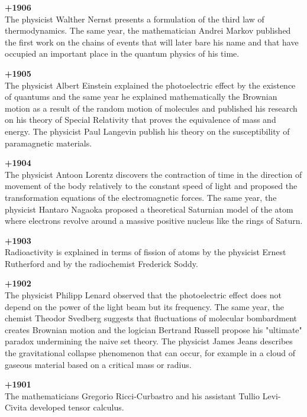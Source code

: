 \textbf{+1906}\\
The physicist Walther Nernst presents a formulation of the third law of thermodynamics. The same year, the mathematician Andrei Markov published the first work on the chains of events that will later bare his name and that have occupied an important place in the quantum physics of his time. 

\textbf{+1905}\\
The physicist Albert Einstein explained the photoelectric effect by the existence of quantums and the same year he explained mathematically the Brownian motion as a result of the random motion of molecules and published his research on his theory of Special Relativity that proves the equivalence of mass and energy. The physicist Paul Langevin publish his theory on the susceptibility of paramagnetic materials.

\textbf{+1904}\\
The physicist Antoon Lorentz discovers the contraction of time in the direction of movement of the body relatively to the constant speed of light and proposed the transformation equations of the electromagnetic forces. The same year, the physicist Hantaro Nagaoka proposed a theoretical Saturnian model of the atom where electrons revolve around a massive positive nucleus like the rings of Saturn.

\textbf{+1903}\\
Radioactivity is explained in terms of fission of atoms by the physicist Ernest Rutherford and by the radiochemist Frederick Soddy.

\pagebreak
\textbf{+1902}\\
The physicist Philipp Lenard observed that the photoelectric effect does not depend on the power of the light beam but its frequency. The same year, the chemist Theodor Svedberg suggests that fluctuations of molecular bombardment creates Brownian motion and the logician Bertrand Russell propose his "ultimate" paradox undermining the naive set theory. The physicist James Jeans describes the gravitational collapse phenomenon that can occur, for example in a cloud of gaseous material based on a critical mass or radius.

\textbf{+1901}\\
The mathematicians Gregorio Ricci-Curbastro and his assistant Tullio Levi-Civita developed tensor calculus.


